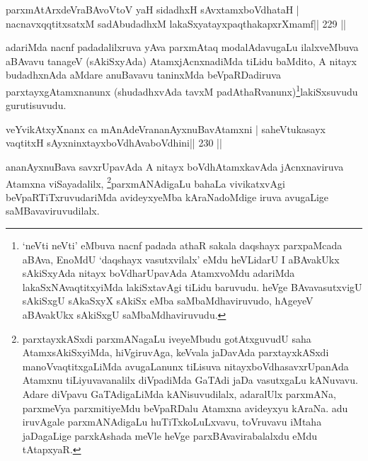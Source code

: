 
\begin{shl}
parxmAtArxdeVraBAvoV\s toV yaH sidadhxH sAvxtamxboVdhataH |
nacnavxqqtitxsatxM sadAbudadhxM lakaSxyatayxpaqthakapxrXmamf\hfill || 229 ||
\end{shl}

\begin{artha}
adariMda nacnf padadalilxruva yAva parxmAtaq modalAdavugaLu
ilalxveMbuva aBAvavu tanageV (sAkiSxyAda) AtamxjAcnxnadiMda tiLidu
baMdito, A nitayx budadhxnAda aMdare anuBavavu taninxMda
beVpaRDadiruva parxtayxgAtamxnanunx (shudadhxvAda
tavxM padAthaRvanunx)\footnote{`neVti neVti' eMbuva nacnf padada
  athaR sakala daqshayx parxpaMcada aBAva, EnoMdU `daqshayx
  vasutxvilalx' eMdu heVLidarU I aBAvakUkx sAkiSxyAda nitayx
  boVdharUpavAda AtamxvoMdu adariMda lakaSxNAvaqtitxyiMda lakiSxtavAgi
tiLidu baruvudu. heVge BAvavasutxvigU sAkiSxgU sAkaSxyX sAkiSx eMba
saMbaMdhaviruvudo, hAgeyeV aBAvakUkx sAkiSxgU saMbaMdhaviruvudu.}lakiSxsuvudu
gurutisuvudu.
\end{artha}


\begin{shl}
veYvikAtxyXnanx ca mAnAdeVrananAyxnuBavAtamxni |
saheVtukasayx vaqtitxH sAyxninxtayxboVdhAvaboVdhini\hfill || 230 ||
\end{shl}

\begin{artha}
ananAyxnuBava savxrUpavAda A nitayx boVdhAtamxkavAda jAcnxnaviruva
Atamxna viSayadalilx, \footnote{parxtayxkASxdi parxmANagaLu
  iveyeMbudu gotAtxguvudU saha AtamxsAkiSxyiMda, hiVgiruvAga, keVvala
jaDavAda parxtayxkASxdi manoVvaqtitxgaLiMda avugaLanunx tiLisuva
nitayxboVdhasavxrUpanAda Atamxnu tiLiyuvavanalilx diVpadiMda GaTAdi
jaDa vasutxgaLu kANuvavu. Adare diVpavu GaTAdigaLiMda kANisuvudilalx,
adaralUlx parxmANa, parxmeVya parxmitiyeMdu beVpaRDalu Atamxna
avideyxyu kAraNa. adu iruvAgale parxmANAdigaLu huTiTxkoLuLxvavu,
toVruvavu iMtaha jaDagaLige parxkAshada meVle heVge 
parxBAvavirabalalxdu eMdu tAtapxyaR.}parxmANAdigaLu bahaLa vivikatxvAgi
beVpaRTiTxruvudariMda avideyxyeMba kAraNadoMdige iruva avugaLige
saMBavaviruvudilalx.
\end{artha}



